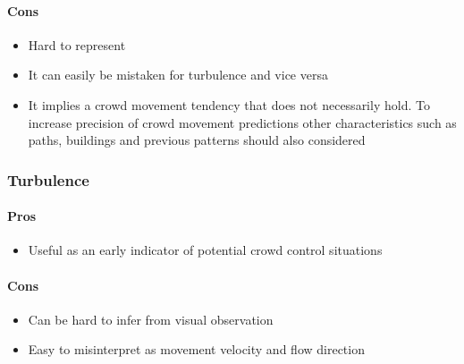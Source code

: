 \paragraph{Cons}
\begin{itemize}
    \item Hard to represent
    \item It can easily be mistaken for turbulence and vice versa
    \item It implies a crowd movement tendency that does not necessarily hold. To increase precision of crowd movement predictions other characteristics such as paths, buildings and previous patterns should also considered
\end{itemize}

\subsubsection{Turbulence}


\paragraph{Pros}
\begin{itemize}
    \item Useful as an early indicator of potential crowd control situations
\end{itemize}

\paragraph{Cons}
\begin{itemize}
    \item Can be hard to infer from visual observation
    \item Easy to misinterpret as movement velocity and flow direction
\end{itemize}

